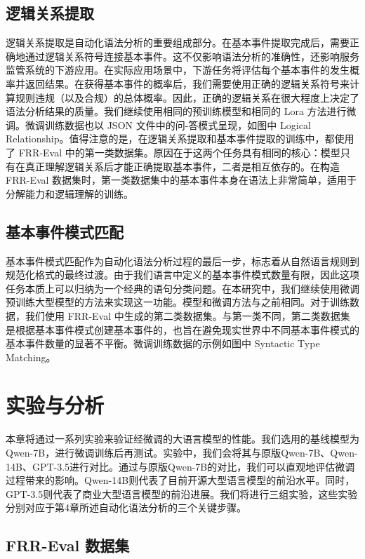 \subsection{逻辑关系提取}

逻辑关系提取是自动化语法分析的重要组成部分。在基本事件提取完成后，需要正确地通过逻辑关系符号连接基本事件。这不仅影响语法分析的准确性，还影响服务监管系统的下游应用。在实际应用场景中，下游任务将评估每个基本事件的发生概率并返回结果。在获得基本事件的概率后，我们需要使用正确的逻辑关系符号来计算规则违规（以及合规）的总体概率。因此，正确的逻辑关系在很大程度上决定了语法分析结果的质量。我们继续使用相同的预训练模型和相同的 Lora 方法进行微调。微调训练数据也以 JSON 文件中的问-答模式呈现，如图中 Logical Relationship。值得注意的是，在逻辑关系提取和基本事件提取的训练中，都使用了 FRR-Eval 中的第一类数据集。原因在于这两个任务具有相同的核心：模型只有在真正理解逻辑关系后才能正确提取基本事件，二者是相互依存的。在构造 FRR-Eval 数据集时，第一类数据集中的基本事件本身在语法上非常简单，适用于分解能力和逻辑理解的训练。

\subsection{基本事件模式匹配}

基本事件模式匹配作为自动化语法分析过程的最后一步，标志着从自然语言规则到规范化格式的最终过渡。由于我们语言中定义的基本事件模式数量有限，因此这项任务本质上可以归纳为一个经典的语句分类问题。在本研究中，我们继续使用微调预训练大型模型的方法来实现这一功能。模型和微调方法与之前相同。对于训练数据，我们使用 FRR-Eval 中生成的第二类数据集。与第一类不同，第二类数据集是根据基本事件模式创建基本事件的，也旨在避免现实世界中不同基本事件模式的基本事件数量的显著不平衡。微调训练数据的示例如图中 Syntactic Type Matching。

\cleardoublepage

\section{实验与分析 }

本章将通过一系列实验来验证经微调的大语言模型的性能。我们选用的基线模型为Qwen-7B，进行微调训练后再测试。实验中，我们会将其与原版Qwen-7B、Qwen-14B、GPT-3.5进行对比。通过与原版Qwen-7B的对比，我们可以直观地评估微调过程带来的影响。Qwen-14B则代表了目前开源大型语言模型的前沿水平。同时，GPT-3.5则代表了商业大型语言模型的前沿进展。我们将进行三组实验，这些实验分别对应于第4章所述自动化语法分析的三个关键步骤。

\subsection{FRR-Eval 数据集}


